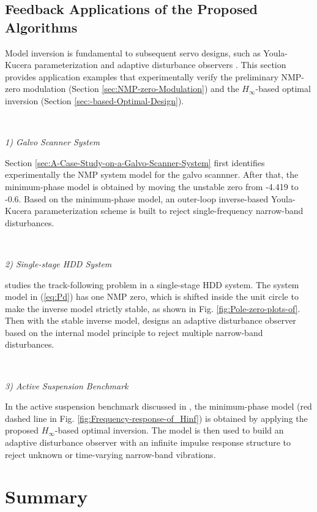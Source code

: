 \documentclass [11pt, proquest] {uwthesis}[2020/02/24]
\begin{document}
\subsection{\label{subsec:Feedback-applications-of}Feedback Applications of
the Proposed Algorithms}

Model inversion is fundamental to subsequent servo designs, such as
Youla-Kucera parameterization and adaptive disturbance observers \cite{jiang2019local,Ohnishi1993,chen2011minimum,apte2019disturbance,wang2017tutorial}.
This section provides application examples that experimentally verify
the preliminary NMP-zero modulation (Section \ref{sec:NMP-zero-Modulation})
and the $H_{\infty}$-based optimal inversion (Section \ref{sec:-based-Optimal-Design}).

\

\noindent \emph{1) Galvo Scanner System}

Section \ref{sec:A-Case-Study-on-a-Galvo-Scanner-System} first identifies experimentally
the NMP system model for the galvo scannner. After that, the minimum-phase model is obtained
by moving the unstable zero from -4.419 to -0.6. Based on the minimum-phase
model, an outer-loop inverse-based
Youla-Kucera parameterization scheme is built to reject single-frequency narrow-band
disturbances. 

\

\noindent \emph{2) Single-stage HDD System}

\cite{chen2011minimum} studies the track-following problem in a single-stage
HDD system. The system model in (\ref{eq:Pd}) has one NMP zero, which
is shifted inside the unit circle to make the inverse model strictly
stable, as shown in Fig. \ref{fig:Pole-zero-plots-of}. Then with
the stable inverse model, \cite{chen2011minimum} designs an adaptive
disturbance observer based on the internal model principle to reject
multiple narrow-band disturbances.

\

\noindent \emph{3) Active Suspension Benchmark}

In the active suspension benchmark discussed in \cite{chen_selective_2013-1},
the minimum-phase model (red dashed line in Fig. \ref{fig:Frequency-response-of_Hinf})
is obtained by applying the proposed $H_{\infty}$-based optimal inversion.
The model is then used to build an adaptive disturbance observer with
an infinite impulse response structure to reject unknown or time-varying
narrow-band vibrations.

\section{Summary}
\end{document}
